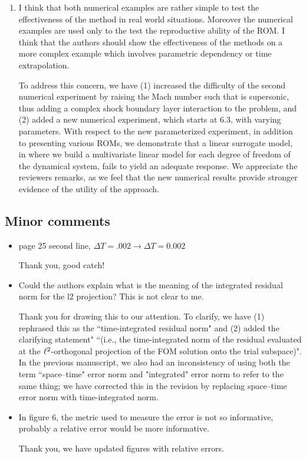 \documentclass[3p,computermodern,10pt]{elsarticle}
\begin{document}
\begin{enumerate}
\item I think that both numerical examples are rather simple to test the effectiveness of the method in real world situations. Moreover the numerical examples are used only to the test the reproductive ability of the ROM. I think that the authors should show the effectiveness of the methods on a more complex example which involves parametric dependency or time extrapolation.

{\color{red} To address this concern, we have (1) increased the difficulty of the second numerical experiment by raising the Mach number such that is supersonic, thus adding a complex shock boundary layer interaction to the problem, and (2) added a new numerical experiment, which starts at 6.3, with varying parameters. With respect to the new parameterized experiment, in addition to presenting various ROMs, we demonstrate that a linear surrogate model, in where we build a multivariate linear model for each degree of freedom of the dynamical system, fails to yield an adequate response. We appreciate the reviewers remarks, as we feel that the new numerical results provide stronger evidence of the utility of the approach.}  

\end{enumerate}

\subsection{Minor comments}

\begin{itemize}
\item page 25 second line, $\Delta T = .002 \rightarrow  \Delta T = 0.002$ 

{\color{red} Thank you, good catch!}

\item Could the authors explain what is the meaning of the integrated residual norm for the l2
projection? This is not clear to me.

{\color{red} Thank you for drawing this to our attention. To clarify, we have (1) rephrased this as the ``time-integrated residual norm" and (2) added the clarifying statement" ``(i.e., the time-integrated norm of the residual evaluated at the $\ell^2$-orthogonal projection of the FOM solution onto the trial subspace)". In the previous manuscript, we also had an inconsistency of using both the term ``space--time" error norm and "integrated" error norm to refer to the same thing; we have corrected this in the revision by replacing space--time error norm with time-integrated norm.} 

\item In figure 6, the metric used to measure the error is not so informative, probably a relative error would be more informative.

{\color{red} Thank you, we have updated figures with relative errors.}
\end{itemize}
\end{document}

